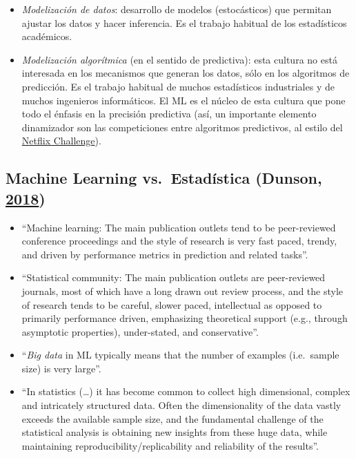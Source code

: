 \documentclass[
  spanish,
]{book}
\theoremstyle{break}
\theoremstyle{definition}
\theoremstyle{definition}
\theoremstyle{definition}
\theoremstyle{remark}
\begin{document}
\begin{itemize}
\item
  \emph{Modelización de datos}: desarrollo de modelos (estocásticos) que permitan ajustar los datos y hacer inferencia. Es el trabajo habitual de los estadísticos académicos.
\item
  \emph{Modelización algorítmica} (en el sentido de predictiva): esta cultura no está interesada en los mecanismos que generan los datos, sólo en los algoritmos de predicción. Es el trabajo habitual de muchos estadísticos industriales y de muchos ingenieros informáticos. El ML es el núcleo de esta cultura que pone todo el énfasis en la precisión predictiva (así, un importante elemento dinamizador
  son las competiciones entre algoritmos predictivos, al estilo del \href{https://en.wikipedia.org/wiki/Netflix_Prize}{Netflix Challenge}).
\end{itemize}

\hypertarget{machine-learning-vs.-estaduxedstica-dunson2018statistics}{%
\subsection{\texorpdfstring{Machine Learning vs.~Estadística (Dunson, \protect\hyperlink{ref-dunson2018statistics}{2018})}{Machine Learning vs.~Estadística (Dunson, 2018)}}\label{machine-learning-vs.-estaduxedstica-dunson2018statistics}}

\begin{itemize}
\item
  ``Machine learning: The main publication outlets tend to be peer-reviewed conference proceedings and the style of research is very fast paced, trendy, and driven by performance metrics in prediction and related tasks''.
\item
  ``Statistical community: The main publication outlets are peer-reviewed journals, most of which have a long drawn out review process, and the style of research tends to be careful, slower paced, intellectual as opposed to primarily performance driven, emphasizing theoretical support (e.g., through asymptotic properties), under-stated, and conservative''.
\item
  ``\emph{Big data} in ML typically means that the number of examples (i.e.~sample size) is very large''.
\item
  ``In statistics (\ldots) it has become common to collect high dimensional, complex and intricately structured data. Often the dimensionality of the data vastly exceeds the available sample size, and the fundamental challenge of the statistical analysis is obtaining new insights from these huge data, while maintaining reproducibility/replicability and reliability of the results''.
\end{itemize}
\end{document}
